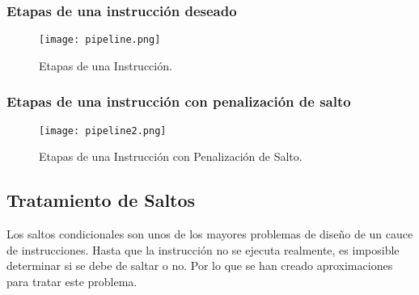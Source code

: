 \documentclass{article}
\begin{document}
\subsubsection*{Etapas de una instrucci\'{o}n deseado}
\begin{figure}[ht]
      \centering
      \texttt{[image: pipeline.png]}
      \caption{Etapas de una Instrucci\'{o}n.
      \cite{stallings2006organización}}
      \label{fig:structure-and-function-cpu-9}
\end{figure}
\newpage

\subsubsection*{Etapas de una instrucci\'{o}n con penalizaci\'{o}n de salto}
\begin{figure}[ht]
      \centering
      \texttt{[image: pipeline2.png]}
      \caption{Etapas de una Instrucci\'{o}n con Penalizaci\'{o}n de Salto.
      \cite{stallings2006organización}}
      \label{fig:structure-and-function-cpu-10}
\end{figure}

\subsection*{Tratamiento de Saltos}
Los saltos condicionales son unos de los mayores problemas de dise\~{n}o de
un cauce de instrucciones. Hasta que la instrucci\'{o}n no se ejecuta realmente,
es imposible determinar si se debe de saltar o no. Por lo que se han creado
aproximaciones para tratar este problema.
\end{document}
